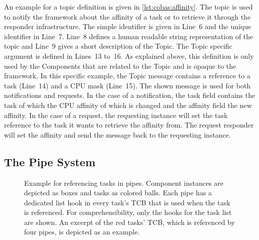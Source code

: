 An example for a topic definition is given in \cref{lst:cobas:affinity}. The topic is used to notify the framework about the affinity of a task or to retrieve it through the responder infrastructure. The simple identifier is given in Line~6 and the unique identifier in Line~7. Line~8 defines a human readable string representation of the topic and Line~9 gives a short description of the Topic. The Topic specific argument is defined in Lines~13 to~16. As explained above, this definition is only used by the Components that are related to the Topic and is opaque to the \cobas{} framework. In this specific example, the Topic message contains a reference to a task (Line~14) and a CPU mask (Line~15). The shown message is used for both notifications and requests. In the case of a notification, the task field contains the task of which the CPU affinity of which is changed and the affinity field the new affinity. In the case of a request, the requesting instance will set the task reference to the task it wants to retrieve the affinity from. The request responder will set the affinity and send the message back to the requesting instance.

\subsection{The Pipe System}%
\label{sec:impl:pipes}

\begin{figure}[t!]\centering
	\caption[Example for referencing tasks in \cobas{} pipes.]{Example for referencing tasks in \cobas{} pipes. Component instances are depicted as boxes and tasks as colored balls. Each pipe has a dedicated list hook in every task's TCB that is used when the task is referenced. For comprehensibility, only the hooks for the task list are shown. An excerpt of the red tasks' TCB, which is referenced by four pipes, is depicted as an example.}%
	\label{fig:impl:pipe}
\end{figure}

